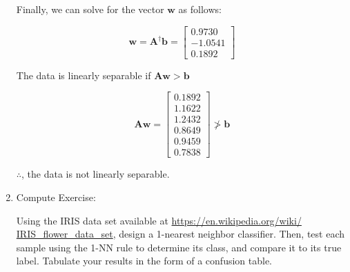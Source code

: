 \documentclass[fleqn]{article}
\begin{document}
\begin{enumerate}
		Finally, we can solve for the vector $\mathbf{w}$ as follows:
		
		\begin{equation*}
			\mathbf{w} = \mathbf{A}^{\dag}\mathbf{b} = \begin{bmatrix} 0.9730 \\ -1.0541 \\ 0.1892 \end{bmatrix}
		\end{equation*}
		
		The data is linearly separable if $\mathbf{A}\mathbf{w} > \mathbf{b}$
		
		\begin{equation*}
			\mathbf{A}\mathbf{w} = \begin{bmatrix}
				0.1892 \\
    				1.1622 \\
   	 			1.2432 \\
    				0.8649 \\
    				0.9459 \\
    				0.7838
			\end{bmatrix} \ngtr \mathbf{b}
		\end{equation*}
		
		$\therefore$, the data is not linearly separable.
		
		\item Compute Exercise:
		
		Using the IRIS data set available at \href{https://en.wikipedia.org/wiki/IRIS_flower_data_set}{https://en.wikipedia.org/wiki/\\IRIS\_flower\_data\_set}, design a 1-nearest neighbor classifier. Then, test each sample using the 1-NN rule to determine its class, and compare it to its true label. Tabulate your results in the form of a confusion table.
		
	\end{enumerate}
\end{document}
